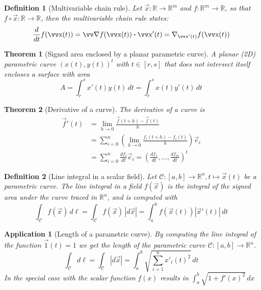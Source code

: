 \documentclass[twocolumn, margin=small]{tex/hsrzf}
\theoremstyle{fuvarzf}
\newtheorem{theorem}{Theorem}
\newtheorem{application}{Application}
\newtheorem{definition}{Definition}
\begin{document}
\begin{definition}[Multivariable chain rule]
  Let \(\vec{x}: \mathbb{R} \to \mathbb{R}^m\) and \(f: \mathbb{R}^m \to
  \mathbb{R}\), so that \(f\circ\vec{x}: \mathbb{R} \to \mathbb{R}\), then
  the multivariable chain rule states:
  \[
    \frac{d}{dt}f(\vec{x}(t)) = \grad f (\vec{x}(t)) \dotp \vec{x}'(t)
      = \nabla_{\vec{x}'(t)} f(\vec{x}(t))
  \]
\end{definition}

\begin{theorem}[Signed area enclosed by a planar parametric curve]
  A planar (2D) parametric curve \((x(t), y(t))^t\) with \(t\in[r,s]\) that does
  not intersect itself encloses a surface with area
  \[
    A = \int_r^s x'(t)y(t) \,dt
      = \int_r^s x(t)y'(t) \,dt
  \]
\end{theorem}

\begin{theorem}[Derivative of a curve]
  The derivative of a curve is
  \begin{align*}
    \vec{f}'(t) &= \lim_{h\to 0} \frac{\vec{f}(t + h) - \vec{f}(t)}{h} \\
    &= \sum_{i=0}^n \left(\lim_{h\to 0} \frac{f_i(t+h) - f_i(t)}{h}\right) \vec{e}_i \\
    &= \sum_{i=0}^n \frac{df_i}{dt}\vec{e}_i
    = \left(\frac{df_1}{dt}, \ldots, \frac{df_m}{dt}\right)^t
  \end{align*}
\end{theorem}

\begin{definition}[Line integral in a scalar field]
  Let \(\mathcal{C}:[a,b]\to\mathbb{R}^n, t \mapsto \vec{x}(t)\) be a
  parametric curve. The \emph{line integral} in a field \(f(\vec{x})\) is the
  integral of the signed area under the curve traced in \(\mathbb{R}^n\), and
  is computed with
  \[
    \int_\mathcal{C} f(\vec{x}) \,d\ell 
    = \int_\mathcal{C} f(\vec{x}) \,|d\vec{x}|
    = \int_a^b f(\vec{x}(t)) |\vec{x}'(t)| \, dt
  \]
\end{definition}

\begin{application}[Length of a parametric curve]
  By computing the line integral of the function \(\vec{1}(t) = 1\) we get the
  length of the parametric curve \(\mathcal{C}:[a,b]\to\mathbb{R}^n\).
  \[
    \int_\mathcal{C}d\ell 
    = \int_\mathcal{C} |d\vec{x}|
    = \int_a^b \sqrt{\sum_{i=1}^n x'_i(t)^2} \,dt
  \]
  In the special case with the scalar function \(f(x)\) results in
  \(\int_a^b\sqrt{1+f'(x)^2}\,dx\)
\end{application}
\end{document}

